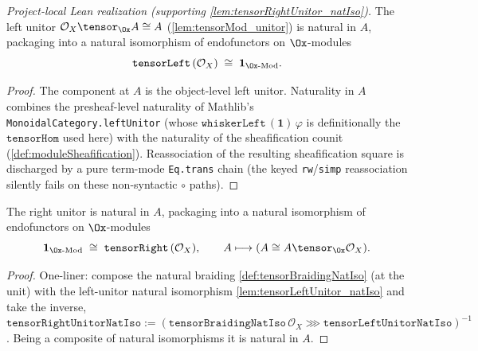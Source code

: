 \begin{lemma}

  \label{lem:tensorLeftUnitor_natIso}
  \textit{Project-local Lean realization (supporting \cref{lem:tensorRightUnitor_natIso}).}
  The left unitor $\mathcal{O}_X \tensor_{\Ox} A \cong A$ (\cref{lem:tensorMod_unitor}) is
  natural in $A$, packaging into a natural isomorphism of endofunctors on $\Ox$-modules
  \[
    \texttt{tensorLeft}\,(\mathcal{O}_X) \;\cong\; \mathbf{1}_{\Ox\text{-Mod}}.
  \]
  \begin{proof}
    The component at $A$ is the object-level left unitor. Naturality in $A$ combines the
    presheaf-level naturality of Mathlib's \texttt{MonoidalCategory.leftUnitor}
    (whose $\texttt{whiskerLeft}\,(\mathbf{1})\,\varphi$ is definitionally the
    $\texttt{tensorHom}$ used here) with the naturality of the sheafification counit
    (\cref{def:moduleSheafification}). Reassociation of the resulting sheafification square is
    discharged by a pure term-mode \texttt{Eq.trans} chain (the keyed \texttt{rw}/\texttt{simp}
    reassociation silently fails on these non-syntactic $\circ$ paths).
  \end{proof}
\end{lemma}

\begin{lemma}

  \label{lem:tensorRightUnitor_natIso}
  The right unitor is natural in $A$, packaging into a natural isomorphism of endofunctors on
  $\Ox$-modules
  \[
    \mathbf{1}_{\Ox\text{-Mod}} \;\cong\; \texttt{tensorRight}\,(\mathcal{O}_X),
    \qquad A \longmapsto (A \cong A \tensor_{\Ox} \mathcal{O}_X).
  \]
  \begin{proof}
    One-liner: compose the natural braiding \cref{def:tensorBraidingNatIso} (at the unit) with
    the left-unitor natural isomorphism \cref{lem:tensorLeftUnitor_natIso} and take the inverse,
    $\texttt{tensorRightUnitorNatIso} := (\texttt{tensorBraidingNatIso}\,\mathcal{O}_X \ggg
    \texttt{tensorLeftUnitorNatIso})^{-1}$. Being a composite of natural isomorphisms it is
    natural in $A$.
  \end{proof}
\end{lemma}


